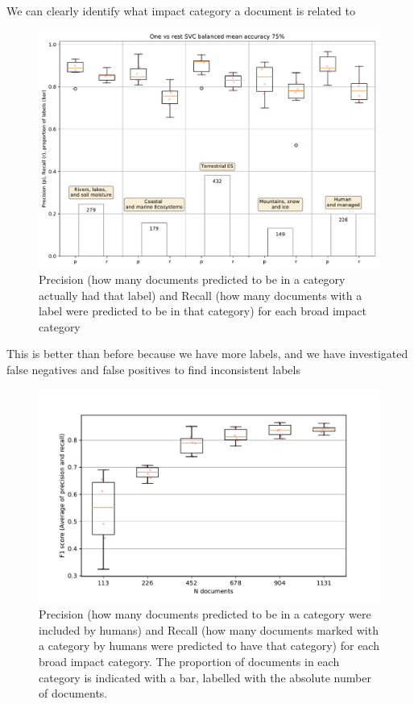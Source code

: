 \documentclass[9pt]{beamer}
\begin{document}
\begin{frame}{We can clearly identify what impact category a document is related to}

\begin{figure}
	\includegraphics[width=0.9\linewidth]{../plots/progress/cats_prediction.pdf}
	\caption{Precision (how many documents predicted to be in a category actually had that label) and Recall (how many documents with a label were predicted to be in that category) for each broad impact category}
\end{figure}

\end{frame}

\begin{frame}{This is better than before because we have more labels, and we have investigated false negatives and false positives to find inconsistent labels}

\begin{figure}
	\includegraphics[width=0.8\linewidth]{../plots/progress/cats_prediction_n.pdf}
	\caption{Precision (how many documents predicted to be in a category were included by humans) and Recall (how many documents marked with a category by humans were predicted to have that category) for each broad impact category. The proportion of documents in each category is indicated with a bar, labelled with the absolute number of documents.}
\end{figure}

\end{frame}
\end{document}
